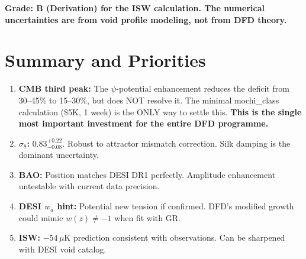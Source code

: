 \documentclass[11pt]{article}
\begin{document}
\textbf{Grade: B (Derivation) for the ISW calculation.  The numerical
uncertainties are from void profile modeling, not from DFD theory.}


\section*{Summary and Priorities}

\begin{enumerate}
\item \textbf{CMB third peak:} The $\psi$-potential enhancement reduces
  the deficit from 30--45\% to 15--30\%, but does NOT resolve it.
  The minimal mochi\_class calculation (\$5K, 1 week) is the ONLY way to
  settle this.  \textbf{This is the single most important investment
  for the entire DFD programme.}

\item \textbf{$\sigma_8$:} $0.83^{+0.22}_{-0.08}$.  Robust to attractor
  mismatch correction.  Silk damping is the dominant uncertainty.

\item \textbf{BAO:} Position matches DESI DR1 perfectly.  Amplitude
  enhancement untestable with current data precision.

\item \textbf{DESI $w_a$ hint:} Potential new tension if confirmed.
  DFD's modified growth could mimic $w(z) \neq -1$ when fit with GR.

\item \textbf{ISW:} $-54\,\mu$K prediction consistent with observations.
  Can be sharpened with DESI void catalog.
\end{enumerate}
\end{document}
